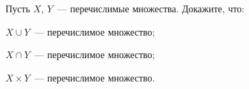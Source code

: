Пусть $X$, $Y$~--- перечислимые множества. Докажите, что:
\begin{enumcyr}
    \item $X \cup Y$~--- перечислимое множество;
    \item $X \cap Y$~--- перечислимое множество;
    \item $X \times Y$~--- перечислимое множество.
\end{enumcyr}